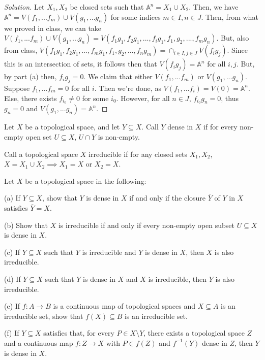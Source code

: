 \documentclass[10pt]{article}
\newenvironment{problem}[2][Problem]{\begin{trivlist}
\item[\hskip \labelsep {\bfseries #1}\hskip \labelsep {\bfseries #2.}]}{\end{trivlist}}
\begin{document}
\begin{proof}[Solution]
Let $X_1, X_2$ be closed sets such that $\mathbb{A}^n = X_1 \cup X_2$. Then, we have $\mathbb{A}^n = V(f_1,...f_m) \cup V(g_1,...g_n)$ for some indices $m \in I, n\in J$. Then, from what we proved in class, we can take $V(f_1,...f_m) \cup V(g_1,...g_n) = V(f_1g_1,f_2g_1,...,f_ig_1,f_1,g_2,...,f_mg_n)$. But, also from class,  $V(f_1g_1,f_2g_1,...,f_mg_1,f_1,g_2,...,f_ng_m) = \cap_{i \in I, j\in J} V(f_ig_j)$. Since this is an intersection of sets, it follows then that $ V(f_ig_j) = \mathbb{A}^n$ for all $i,j$. But, by part (a) then, $f_ig_j = 0$. We claim that either $V(f_1,...f_m)$ or $V(g_1,...g_n)$. Suppose $f_1,...f_m = 0$ for all $i$. Then we're done, as $V(f_1,...f_i) = V(0) = \mathbb{A}^n$. Else, there exists $f_{i_0} \not= 0$ for some $i_0$. However, for all $n \in J$, $f_{i_0}g_n = 0$, thus $g_n = 0$ and  $V(g_1,...g_n) = \mathbb{A}^n$.

\end{proof}

\begin{problem}{1.4}
Let $X$ be a topological space, and let $Y\subseteq X$. Call $Y$ dense in $X$ if for every non-empty open set $U \subseteq X$, $U \cap Y$ is non-empty.

Call a topological space $X$ irreducible if for any closed sets $X_1, X_2$, $X = X_1 \cup X_2 \implies X_1 = X \text{ or } X_2 = X$.

Let $X$ be a topological space in the following:

(a) If $Y \subseteq X$, show that $Y$ is dense in $X$ if and only if the closure $\overline{Y}$ of $Y$ in $X$ satisfies $\overline{Y} = X$.

(b) Show that $X$ is irreducible if and only if every non-empty open subset $U \subseteq X$ is dense in $X$. 

(c) If $Y \subseteq X$ such that $Y$ is irreducible and $Y$ is dense in $X$, then $X$ is also irreducible.

(d) If $Y \subseteq X$ such that $Y$ is dense in $X$ and $X$ is irreducible, then $Y$ is also irreducible.

(e) If $f: A \rightarrow B$ is a continuous map of topological spaces and $X \subseteq A$ is an irreducible set, show that $f(X) \subseteq B$ is an irreducible set.

(f) If $Y \subseteq X$ satisfies that, for every $P \in X \setminus Y$, there exists a topological space $Z$ and a continuous map $f : Z \rightarrow X$ with $P \in f(Z)$ and $f^{-1}(Y)$ dense in $Z$, then $Y$ is dense in $X$.

\end{problem}
\end{document}
